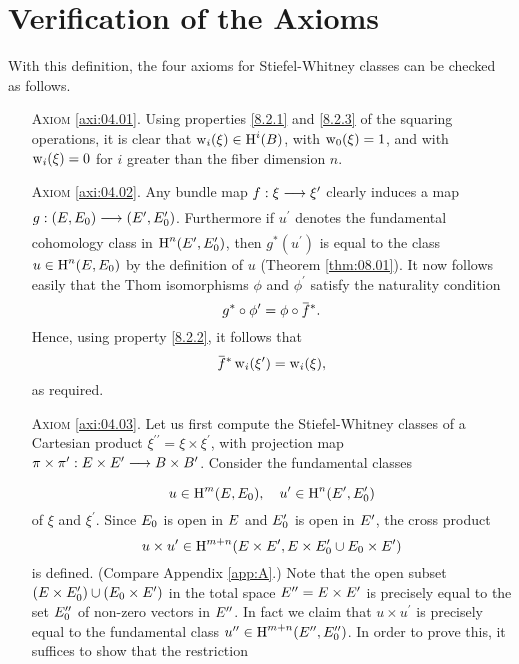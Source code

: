 \documentclass[../main]{subfiles}
\begin{document}
\section{Verification of the Axioms}\label{sec:7.1}

With this definition, the four axioms for Stiefel-Whitney classes can be checked as follows.
\begin{enumerate}
\item[\textsc{Axiom} \ref{axi:04.01}.] Using properties \ref{8.2.1} and \ref{8.2.3} of the squaring operations, it is clear that $\operatorname{w}_{i}(\xi) \in \operatorname{H}^{i}(B )$, with $\operatorname{w}_{0}(\xi)=1$, and with $\operatorname{w}_{i}(\xi)=0$ for $i$ greater than the fiber dimension $n$.
\item[\textsc{Axiom} \ref{axi:04.02}.]  Any bundle map $f:\xi\varrightarrow{}\xi^\prime$ clearly induces a map $g:(\total, \total_{0})\varrightarrow{}(\total^{\prime}, \total_{0}^{\prime})$. Furthermore if $u^{\prime}$ denotes the fundamental cohomology class in $\operatorname{H}^{n}(E^{\prime}, E_{0}^{\prime})$, then $g^{\ast}(u^{\prime})$ is equal to the class $u \in \operatorname{H}^{ n }(E, E_{0})$ by the definition of $u$ (Theorem \ref{thm:08.01}). It now follows easily that the Thom isomorphisms $\phi$ and $\phi^{\prime}$ satisfy the naturality condition
\[
g^{\ast} \circ \phi^{\prime}=\phi \circ \xoverline{f}^\ast.
\]
Hence, using property \ref{8.2.2}, it follows that
\[
\xoverline{f}^\ast \sw_{i}(\xi^{\prime})=\sw_{i}(\xi),
\]
as required.
\item[\textsc{Axiom} \ref{axi:04.03}.]  Let us first compute the Stiefel-Whitney classes of a Cartesian product $\xi^{\prime \prime}=\xi \times \xi^{\prime}$, with projection map $\pi \times \pi^{\prime}:{\total \times \total^{\prime}}\varrightarrow{} {\B  \times \B ^{\prime}}$. Consider the fundamental classes
\[
u \in \operatorname{H}^{m}(E, E_{0}), \quad u^{\prime} \in \operatorname{H}^{n}(E^{\prime}, E_{0}^{\prime})
\]
of $\xi$ and $\xi^{\prime}$. Since $E_{0}$ is open in $E$ and $E_{0}^{\prime}$ is open in $E^{\prime}$, the cross product
\[
u \times u^{\prime} \in \operatorname{H}^{m+ n }(E \times E^{\prime}, E \times E_{0}^{\prime} \cup E_{0} \times E^{\prime})
\]
is defined. (Compare Appendix \ref{app:A}.) Note that the open subset\newline $(E \times E_{0}^{\prime})\cup(E_{0} \times E^{\prime})$ in the total space $E^{\prime \prime}=E \times E^{\prime}$ is precisely equal to the set $E_{0}^{\prime \prime}$ of non-zero vectors in $E^{\prime\prime}$. In fact we claim that $u \times u^{\prime}$ is precisely equal to the fundamental class $u^{\prime \prime} \in \operatorname{H}^{m+n}(E^{\prime \prime}, E_{0}^{\prime \prime})$. In order to prove this, it suffices to show that the restriction

\end{enumerate}
\end{document}
